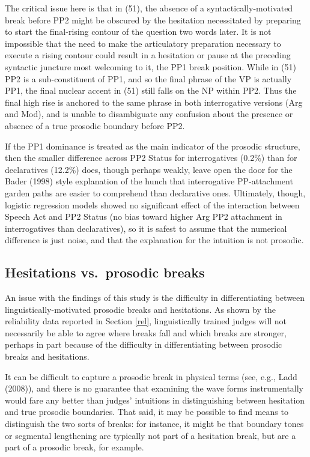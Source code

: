 \documentclass[11pt,oneside]{book}
\begin{document}
The critical issue here is that in (51), the absence of a syntactically-motivated break before PP2 might be obscured by the hesitation necessitated by preparing to start the final-rising contour of the question two words later. It is not impossible that the need to make the articulatory preparation necessary to execute a rising contour could result in a hesitation or pause at the preceding syntactic juncture most welcoming to it, the PP1 break position. While in (51) PP2 is a sub-constituent of PP1, and so the final phrase of the VP is actually PP1, the final nuclear accent in (51) still falls on the NP within PP2. Thus the final high rise is anchored to the same phrase in both interrogative versions (Arg and Mod), and is unable to disambiguate any confusion about the presence or absence of a true prosodic boundary before PP2.

If the PP1 dominance is treated as the main indicator of the prosodic structure, then the smaller difference across PP2 Status for interrogatives (0.2\%) than for declaratives (12.2\%) does, though perhaps weakly, leave open the door for the Bader (1998) style explanation of the hunch that interrogative PP-attachment garden paths are easier to comprehend than declarative ones. Ultimately, though, logistic regression models showed no significant effect of the interaction between Speech Act and PP2 Status (no bias toward higher Arg PP2 attachment in interrogatives than declaratives), so it is safest to assume that the numerical difference is just noise, and that the explanation for the intuition is not prosodic.

\hypertarget{hesi}{%
\subsection{Hesitations vs.~prosodic breaks}\label{hesi}}

An issue with the findings of this study is the difficulty in differentiating between linguistically-motivated prosodic breaks and hesitations. As shown by the reliability data reported in Section \ref{rel}, linguistically trained judges will not necessarily be able to agree where breaks fall and which breaks are stronger, perhaps in part because of the difficulty in differentiating between prosodic breaks and hesitations.

It can be difficult to capture a prosodic break in physical terms (see, e.g., Ladd (2008)), and there is no guarantee that examining the wave forms instrumentally would fare any better than judges' intuitions in distinguishing between hesitation and true prosodic boundaries. That said, it may be possible to find means to distinguish the two sorts of breaks: for instance, it might be that boundary tones or segmental lengthening are typically not part of a hesitation break, but are a part of a prosodic break, for example.
\end{document}
